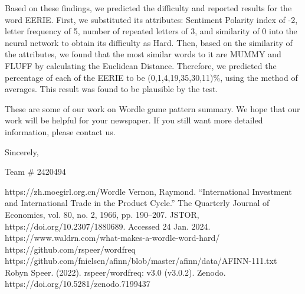 \documentclass[12pt]{article}  %
\begin{document}
Based on these findings, we predicted the difficulty and reported results for the word EERIE. First, we substituted its attributes: Sentiment Polarity index of -2, letter frequency of 5, number of repeated letters of 3, and similarity of 0 into the neural network to obtain its difficulty as Hard. Then, based on the similarity of the attributes, we found that the most similar words to it are MUMMY and FLUFF by calculating the Euclidean Distance. Therefore, we predicted the percentage of each of the EERIE to be (0,1,4,19,35,30,11)\%, using the method of averages. This result was found to be plausible by the test.

These are some of our work on Wordle game pattern summary. We hope that our work will be helpful for your newspaper. If you still want more detailed information, please contact us.

\hfill Sincerely,

\hfill Team \# 2420494

\clearpage   %
\begin{thebibliography}{99}
     https://zh.moegirl.org.cn/Wordle
	 Vernon, Raymond. “International Investment and International Trade in the Product Cycle.” The Quarterly Journal of Economics, vol. 80, no. 2, 1966, pp. 190–207. JSTOR, https://doi.org/10.2307/1880689. Accessed 24 Jan. 2024.
	 https://www.waldrn.com/what-makes-a-wordle-word-hard/
	 https://github.com/rspeer/wordfreq
	https://github.com/fnielsen/afinn/blob/master/afinn/data/AFINN-111.txt
	 Robyn Speer. (2022). rspeer/wordfreq: v3.0 (v3.0.2). Zenodo. https://doi.org/10.5281/zenodo.7199437
\end{thebibliography} 
\end{document}

